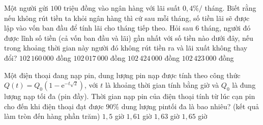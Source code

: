 

\begin{ex}%
	Một người gửi $100$ triệu đồng vào ngân hàng với lãi suất $0{,}4\% /$ tháng.  Biết rằng nếu không rút tiền ta khỏi ngân hàng thì cứ sau mỗi tháng, số tiền lãi sẽ được lập vào vốn ban đầu để tính lãi cho tháng tiếp theo. Hỏi sau $6$ tháng, người đó được lĩnh số tiền (cả vốn ban đầu và lãi) gần nhất với số tiền nào dưới đây, nếu trong khoảng thời gian này người đó không rút tiền ra và lãi xuất không thay đổi?
	\choice 
		 {$102\,160\,000$ đồng}
		{$102\,017\,000$  đồng}
		{\True  $102\,424\,000$ đồng}
		 {$102\,423\,000$ đồng}
\end{ex}

\begin{ex}%
	Một điện thoại đang nạp pin, dung lượng pin nạp được tính theo công thức $Q(t)=Q_0\left(1-\mathrm{e}^{-t \sqrt{2}}\right)$, với $t$ là khoảng thời gian tính bằng giờ và $Q_0$ là đung lượng nạp tối đa (pin đầy). Thời gian nạp pin của điện thoại  tính từ lúc cạn pin cho đến khi điện thoại đạt được $90 \%$ dung lượng pintối đa là bao nhiêu? (kết quả làm tròn đến hàng phần trăm)
	 \choice
		 {$1{,}5$ giờ}
		{$1{,}61$ giờ} 
		 {\True $1{,}63$ giờ}
		{$1{,}65$  giờ}
\end{ex}



